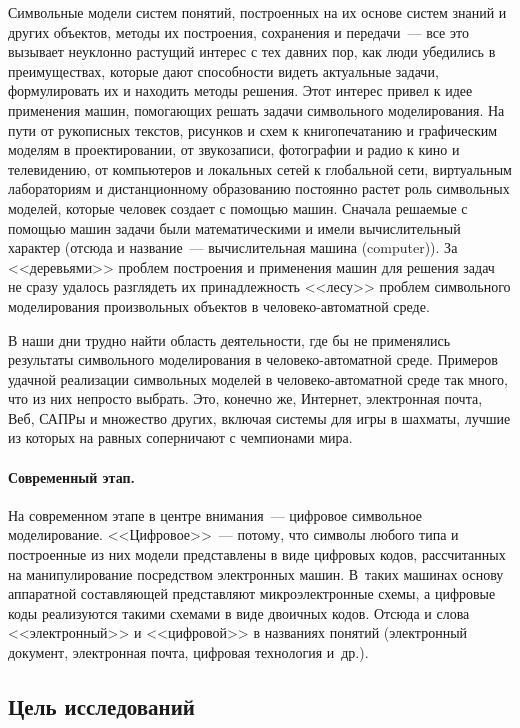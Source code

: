 \begin{multicols}{2}
Символьные модели систем понятий, построенных на их основе систем
знаний и других объектов, методы их построения, сохранения и передачи~---
все это вызывает неуклонно растущий интерес с тех давних пор, как люди
убедились в преимуществах, которые дают способности видеть актуальные
задачи, формулировать их и находить методы решения. Этот интерес привел к
идее применения машин, помогающих решать задачи символьного
моделирования. На пути от рукописных текстов, рисунков и схем к
книгопечатанию и графическим моделям в проектировании, от звукозаписи,
фотографии и радио к кино и телевидению, от компьютеров и локальных сетей
к глобальной сети, виртуальным лабораториям и дистанционному образованию
постоянно растет роль символьных моделей, которые человек создает с
помощью машин. Сначала решаемые с помощью машин задачи были
математическими и имели вычислительный характер (отсюда и
название~--- вычислительная машина (computer)). За <<деревьями>> проблем
построения и применения машин для решения задач не сразу удалось
разглядеть их принадлежность <<лесу>> проблем символьного моделирования
произвольных объектов в человеко-автоматной среде.

В наши дни трудно найти область деятельности, где бы не применялись
результаты символьного моделирования в человеко-автоматной среде.
Примеров удачной реализации символьных моделей в человеко-автоматной
среде так много, что из них непросто выбрать. Это, конечно же, Интернет,
электронная почта, Веб, САПРы и множество других, включая системы для
игры в шахматы, лучшие из которых на равных соперничают с чемпионами
мира.

\paragraph*{Современный этап.}На современном этапе в центре
внимания~--- цифровое символьное моделирование. <<Цифровое>>~--- потому, что 
символы любого типа и построенные из них модели представлены в виде цифровых 
кодов, рассчитанных на манипулирование посредством электронных машин. В~таких 
машинах основу аппаратной со\-став\-ля\-ющей представляют микроэлектронные 
схемы, а цифровые коды реализуются такими схемами в виде двоичных кодов. Отсюда 
и слова <<электронный>> и <<циф\-ро\-вой>> в названиях понятий (электронный 
документ, электронная почта, цифровая технология и~др.). {

}

\subsection{Цель исследований} %


\end{multicols}
